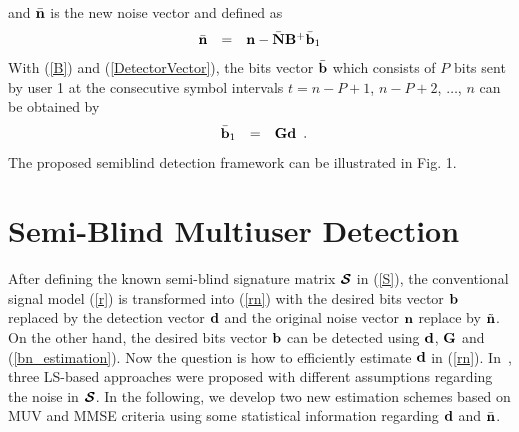 \documentclass[a4paper,10pt,fleqn, twocolumn]{IEEETran}
\newcommand{\bb}{{\bf b}}
\newcommand{\bd}{{\bf d}}
\newcommand{\bG}{{\bf G}}
\newcommand{\bn}{{\bf n}}
\newcommand{\bN}{{\bf N}}
\newcommand{\bB}{{\bf B}}
\newcommand{\bcS}{{\mbox {\boldmath ${\cal S}$}}}
\begin{document}
\noindent and $\bar{\bn}$ is the new noise vector and defined as
\begin{equation}
\begin{array}{rcl}
\bar{\bn}&=&\bn-\bar{\bN}\bB^{+}\bar\bb_1
\end{array} \label{new_noise}
\end{equation}
\noindent With (\ref{B}) and (\ref{DetectorVector}), the bits
vector $\bar{\bb}$ which consists of $P$ bits sent by user 1 at
the consecutive symbol intervals $t=n-P+1$, $n-P+2$, $\ldots$, $n$
can be obtained by
\begin{equation}
\begin{array}{rcl}
\bar{\bb}_1&=& \bG\bd
\end{array}. \label{bn_estimation}
\end{equation}
\noindent The proposed semiblind detection framework can be
illustrated in Fig. 1.

\section{Semi-Blind Multiuser Detection}
After defining the known semi-blind signature matrix $\bcS$ in
(\ref{S}), the conventional signal model (\ref{r}) is transformed
into (\ref{rn}) with the desired bits vector $\bb$ replaced by the
detection vector $\bd$ and the original noise vector $\bn$ replace
by $\tilde{\bn}$. On the other hand, the desired bits vector $\bb$
can be detected using $\bd$, $\bG$ and (\ref{bn_estimation}). Now
the question is how to efficiently estimate $\bd$ in (\ref{rn}).
In~\cite{Wang03d,Wang03e}, three LS-based approaches were proposed
with different assumptions regarding the noise in $\bcS$. In the
following, we develop two new estimation schemes based on MUV and
MMSE criteria using some statistical information regarding $\bd$
and $\bar\bn$.
\end{document}
